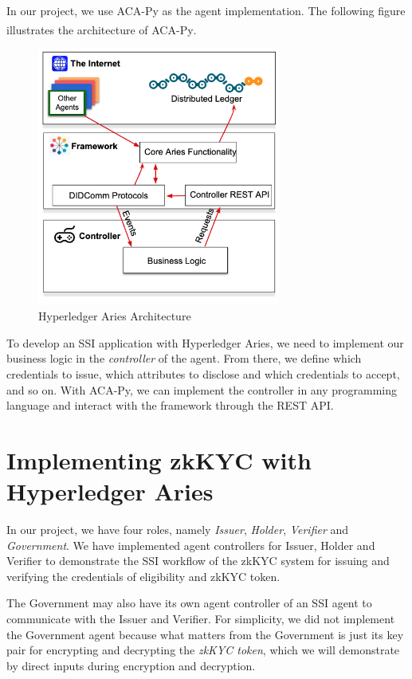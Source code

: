 \documentclass[
]{report}
\begin{document}
In our project, we use ACA-Py as the agent implementation. The following
figure illustrates the architecture of ACA-Py\textsuperscript{\cite{AriesCloudAgentPython}}.

\begin{figure}
\centering
\includegraphics[width=8cm]{aca-py.png}
\caption{Hyperledger Aries Architecture}
\end{figure}

To develop an SSI application with Hyperledger Aries, we need to
implement our business logic in the \emph{controller} of the agent.  
From there, we define which credentials to issue, which attributes to
disclose and which credentials to accept, and so on. With ACA-Py, we
can implement the controller in any programming language and interact
with the framework through the REST API.

\section{Implementing zkKYC with Hyperledger Aries}

In our project, we have four roles, namely \emph{Issuer}, \emph{Holder},
\emph{Verifier} and \emph{Government}. We have implemented agent controllers
for Issuer, Holder and Verifier to demonstrate the SSI workflow of the
zkKYC system for issuing and verifying the credentials of eligibility and
zkKYC token.

The Government may also have its own agent controller of
an SSI agent to communicate with the Issuer and Verifier. For simplicity,
we did not implement the Government agent because what matters from the
Government is just its key pair for encrypting and decrypting the
\emph{zkKYC token}, which we will demonstrate by direct inputs during
encryption and decryption.
\end{document}
